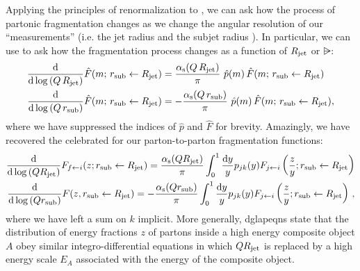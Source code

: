


Applying the principles of renormalization to , we can ask how the process of partonic fragmentation changes as we change the angular resolution of our ``measurements'' (i.e. the jet radius \Rjet{} and the subjet radius \rsub{}).
%
In particular, we can use  to ask how the fragmentation process changes as a function of \(R_\text{jet}\) or \(\rsub\):
\begin{subequations}
\begin{align}
    \label{eq:fragmentation_dglap_upper}
    \frac{\dd}{\dd\log\le(Q\,\Rjet\ri)} \hat{F}(m;\,\rsub\leftarrow \Rjet)
    &=
    \frac{\alphas(Q\,\Rjet)}{\pi}
    \,\,
    \hat{p}(m)
    \,
    \hat{F}(m;\,\rsub\leftarrow \Rjet)
    \\
    \label{eq:fragmentation_dglap_lower}
    \frac{\dd}{\dd\log\le(Q\,\rsub\ri)} \hat{F}(m;\,\rsub\leftarrow \Rjet)
    &=
    -\frac{\alphas(Q\,\rsub)}{\pi}
    \,\,
    \hat{p}(m)
    \,
    \hat{F}(m;\,\rsub\leftarrow \Rjet)
    ,
\end{align}
\end{subequations}
where we have suppressed the indices of \(\hat{p}\) and \(\hat{F}\) for brevity.
%
Amazingly, we have recovered the celebrated  \cite{Gribov:1972ri,Dokshitzer:1977sg,Altarelli:1977zs} for our parton-to-parton fragmentation functions:
\begin{subequations}
\label{eq:dglap-equations-parton-shower}
\begin{align}
    \frac{\dd}{\dd\log\left(Q R_\text{jet}\right)}
    F_{f\leftarrow i}(z; r_\text{sub} \leftarrow R_\text{jet})
    =
    \frac{\alpha_{\mathrm{s}}(QR_\text{jet})}{\pi}
    \int_0^1
    \frac{\dd y}{y}
    p_{j k}(y)
    F_{j\leftarrow i}\left(\frac{z}{y}; r_\text{sub} \leftarrow R_\text{jet}\right)
    \\
    \frac{\dd}{\dd\log\left(Q r_\text{sub}\right)}
    F(z, r_\text{sub} \leftarrow R_\text{jet})
    =
    -
    \frac{\alpha_{\mathrm{s}}(Qr_\text{sub})}{\pi}
    \int_0^1
    \frac{\dd y}{y}
    p_{j k}(y)
    F_{j\leftarrow i}\left(\frac{z}{y}; r_\text{sub} \leftarrow R_\text{jet}\right)
    \,,
\end{align}
\end{subequations}
where we have left a sum on \(k\) implicit.
%
More generally, \glspl{dglapeqn} state that the distribution of energy fractions \(z\) of partons inside a high energy composite object \(A\) obey similar integro-differential equations in which \(QR_\text{jet}\) is replaced by a high energy scale \(E_A\) associated with the energy of the composite object.


